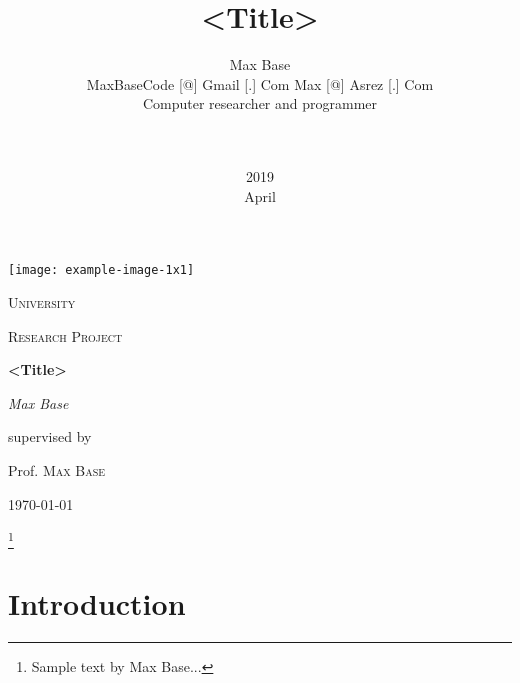 \documentclass{article}
\begin{document}
	\begin{titlepage}
		\centering
		\texttt{[image: example-image-1x1]}\par\vspace{1cm}
		{\scshape\LARGE University \par}
		\vspace{1cm}
		{\scshape\Large Research Project\par}
		\vspace{1.5cm}
		{\huge\bfseries <Title>\par}
		\vspace{2cm}
		{\Large\itshape Max Base\par}

		\vfill
		supervised by\par
		Prof. \textsc{Max Base}
		\vfill

		{\large \today\par}
	\end{titlepage}

\title{<Title>}
\thanks{Sample text by Max Base...}
\date{2019\\ April}
\author{
	Max Base\\
	MaxBaseCode {[@]} Gmail {[.]} Com
	Max {[@]} Asrez {[.]} Com\\
	Computer researcher and programmer\\
	\\\\
}


	\maketitle
	\section{Introduction}
	\blindtext
	\blindtext

 
\end{document}
